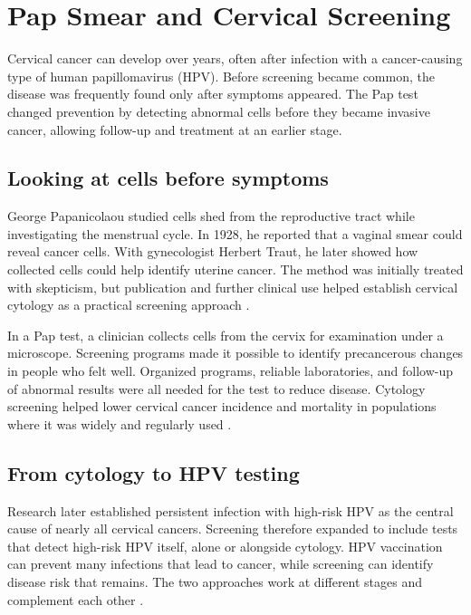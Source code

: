 \documentclass[12pt,oneside]{book}
\begin{document}
\chapter[Pap Smear and Cervical Screening]{Pap Smear and Cervical Screening}

Cervical cancer can develop over years, often after infection with a
cancer-causing type of human papillomavirus (HPV). Before screening became
common, the disease was frequently found only after symptoms appeared. The
Pap test changed prevention by detecting abnormal cells before they became
invasive cancer, allowing follow-up and treatment at an earlier stage.

\section{Looking at cells before symptoms}
George Papanicolaou studied cells shed from the reproductive tract while
investigating the menstrual cycle. In 1928, he reported that a vaginal
smear could reveal cancer cells. With gynecologist Herbert Traut, he later
showed how collected cells could help identify uterine cancer. The method
was initially treated with skepticism, but publication and further
clinical use helped establish cervical cytology as a practical screening
approach \cite{papanicolaouHistory,nciCancerMilestones}.

In a Pap test, a clinician collects cells from the cervix for examination
under a microscope. Screening programs made it possible to identify
precancerous changes in people who felt well. Organized programs, reliable
laboratories, and follow-up of abnormal results were all needed for the
test to reduce disease. Cytology screening helped lower cervical cancer
incidence and mortality in populations where it was widely and regularly
used \cite{nciCervicalScreening}.

\section{From cytology to HPV testing}
Research later established persistent infection with high-risk HPV as the
central cause of nearly all cervical cancers. Screening therefore expanded
to include tests that detect high-risk HPV itself, alone or alongside
cytology. HPV vaccination can prevent many infections that lead to cancer,
while screening can identify disease risk that remains. The two approaches
work at different stages and complement each other \cite{nciCervicalScreening}.
\end{document}
